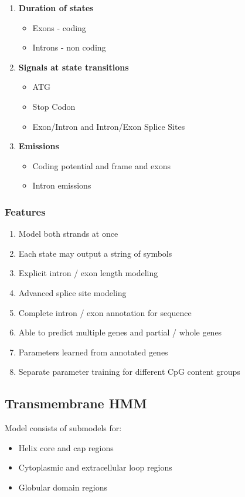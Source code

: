 \documentclass{article}
\begin{document}
\begin{enumerate}
    \item \textbf{Duration of states}
    \begin{itemize}
        \item Exons - coding
        \item Introns - non coding
    \end{itemize}
    \item \textbf{Signals at state transitions}
    \begin{itemize}
        \item ATG
        \item Stop Codon
        \item Exon/Intron and Intron/Exon Splice Sites
    \end{itemize}
    \item \textbf{Emissions}
    \begin{itemize}
        \item Coding potential and frame and exons
        \item Intron emissions
    \end{itemize}
\end{enumerate}

\subsubsection{Features}
\begin{enumerate}
    \item Model both strands at once
    \item Each state may output a string of symbols
    \item Explicit intron / exon length modeling
    \item Advanced splice site modeling
    \item Complete intron / exon annotation for sequence
    \item Able to predict multiple genes and partial / whole genes
    \item Parameters learned from annotated genes
    \item Separate parameter training for different CpG content groups
\end{enumerate}

\subsection{Transmembrane HMM}
Model consists of submodels for:
\begin{itemize}
    \item Helix core and cap regions
    \item Cytoplasmic and extracellular loop regions
    \item Globular domain regions
\end{itemize}
\end{document}
